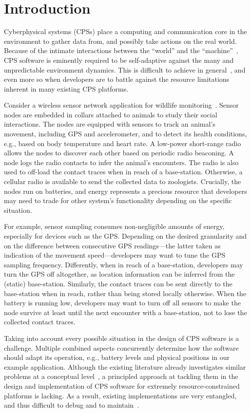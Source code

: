 \section{Introduction}

Cyberphysical systems (CPSs) place a computing and communication core
in the environment to gather data from, and possibly take actions on
the real world. Because of the intimate interactions between the
``world'' and the ``machine''~\cite{jackson}, CPS software is
eminently required to be self-adaptive against the many and
unpredictable environment dynamics. This is difficult to achieve in
general~\cite{}, and even more so when developers are to battle
against the resource limitations inherent in many existing CPS
platforms.

 Consider a wireless sensor network application for
wildlife monitoring~\cite{badgers}. Sensor nodes are embedded in
collars attached to animals to study their social interactions. The
nodes are equipped with sensors to track an animal's movement,
including GPS and accelerometer, and to detect its health conditions,
e.g., based on body temperature and heart rate. A low-power
short-range radio allows the nodes to discover each other based on
periodic radio beaconing. A node logs the radio contacts to infer the
animal's encounters. The radio is also used to off-load the contact
traces when in reach of a base-station. Otherwise, a cellular radio is
available to send the collected data to zoologists. Crucially, the
nodes run on batteries, and energy represents a precious resource that
developers may need to trade for other system's functionality
depending on the specific situation.

For example, sensor sampling consumes non-negligible amounts of
energy, especially for devices such as the GPS. Depending on the
desired granularity and on the difference between consecutive GPS
readings---the latter taken as indication of the movement
speed---developers may want to tune the GPS sampling
frequency. Differently, when in reach of a base-station, developers
may turn the GPS off altogether, as location information can be
inferred from the (static) base-station. Similarly, the contact traces
can be sent directly to the base-station when in reach, rather than
being stored locally otherwise.  When the battery is running low,
developers may want to turn off all sensors to make the node survive
at least until the next encounter with a base-station, not to lose the
collected contact traces.

 Taking into account every possible
situation in the design of CPS software is a challenge. Multiple
combined aspects concurrently determine how the software should adapt
its operation, e.g., battery levels and physical positions in our
example application. Although the existing literature already
investigates similar problems at a conceptual level~\cite{}, a
principled approach at tackling them in the design and implementation
of CPS software for extremely resource-constrained platforms is
lacking. As a result, existing implementations are very entangled, and
thus difficult to debug and to maintain~\cite{programmingsurvey}.

